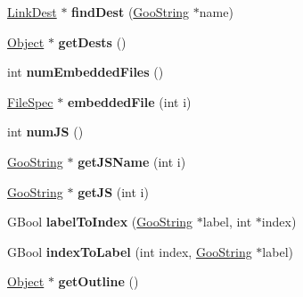 \begin{DoxyCompactItemize}
\item 
\mbox{\label{class_catalog_a0c10c55547767d3a8cf61972f96c3187}} 
\hyperlink{class_link_dest}{Link\+Dest} $\ast$ {\bfseries find\+Dest} (\hyperlink{class_goo_string}{Goo\+String} $\ast$name)
\item 
\mbox{\label{class_catalog_a33c9691909d4a3f14f5041cfe9ac2974}} 
\hyperlink{class_object}{Object} $\ast$ {\bfseries get\+Dests} ()
\item 
\mbox{\label{class_catalog_a1c6dc4cbbd614a17bb47b94cfc2b6eb7}} 
int {\bfseries num\+Embedded\+Files} ()
\item 
\mbox{\label{class_catalog_ac1499f14066de7a2c2a0c1235723b1b5}} 
\hyperlink{class_file_spec}{File\+Spec} $\ast$ {\bfseries embedded\+File} (int i)
\item 
\mbox{\label{class_catalog_a1bdf1696adcd308f87a45add76611020}} 
int {\bfseries num\+JS} ()
\item 
\mbox{\label{class_catalog_a263c6affe9d56181082e172d224cf198}} 
\hyperlink{class_goo_string}{Goo\+String} $\ast$ {\bfseries get\+J\+S\+Name} (int i)
\item 
\mbox{\label{class_catalog_a3dfa9e25de87ba914a59dd3a08447c4a}} 
\hyperlink{class_goo_string}{Goo\+String} $\ast$ {\bfseries get\+JS} (int i)
\item 
\mbox{\label{class_catalog_ab67a069e27355bd7ffa58a7ef8c119a7}} 
G\+Bool {\bfseries label\+To\+Index} (\hyperlink{class_goo_string}{Goo\+String} $\ast$label, int $\ast$index)
\item 
\mbox{\label{class_catalog_a23b313fc609bb378f1ae840b6b8b8609}} 
G\+Bool {\bfseries index\+To\+Label} (int index, \hyperlink{class_goo_string}{Goo\+String} $\ast$label)
\item 
\mbox{\label{class_catalog_a688d21c55be6582d2c9e5a23c924c5e8}} 
\hyperlink{class_object}{Object} $\ast$ {\bfseries get\+Outline} ()
\item 
\mbox{\label{class_catalog_ac03161fc57ea21913eed8ed36ba00bee}} 

\end{DoxyCompactItemize}
